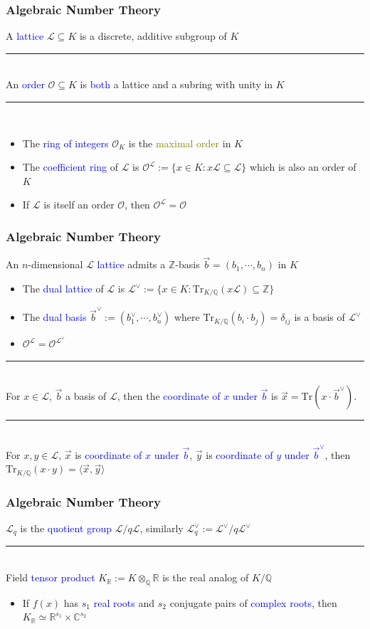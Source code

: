 \documentclass{beamer}
\newcommand{\blue}[1]{\textcolor{blue}{#1}}
\newcommand{\dgreen}[1]{\textcolor{dgreen}{#1}}
\newcommand{\olive}[1]{\textcolor{olive}{#1}}
\newcommand{\cL}{\mathcal{L}}
\newcommand{\cO}{\mathcal{O}}
\newcommand{\bbC}{\mathbb{C}}
\newcommand{\bbQ}{\mathbb{Q}}
\newcommand{\bbR}{\mathbb{R}}
\newcommand{\bbZ}{\mathbb{Z}}
\newcommand{\Tr}{\mathrm{Tr}}
\newcommand{\TrKQ}{\mathrm{Tr}_{K/\mathbb{Q}}}
\newcommand{\cOL}{\mathcal{O}^{\mathcal{L}}}
\newcommand{\cLV}{\mathcal{L}^{\vee}}
\newcommand{\KR}{K_{\mathbb{R}}}
\newcommand{\vb}{\vec{b}}
\newcommand{\vx}{\vec{x}}
\newcommand{\vy}{\vec{y}}
\newcommand{\vbV}{\vec{b}^{\vee}}
\newcommand{\divline}{\noindent\rule{6cm}{0.4pt}}
\begin{document}
\frame
{
  \frametitle{Algebraic Number Theory}
  A \blue{lattice} $\cL\subseteq K$ is a \dgreen{discrete}, \dgreen{additive subgroup} of $K$

  \noindent\rule{6cm}{0.4pt}\\
  An \blue{order} $\cO\subseteq K$ is \blue{both} a \dgreen{lattice} and a \dgreen{subring with unity} in $K$

  \noindent\rule{6cm}{0.4pt}\\
  \begin{itemize}
  	\item The \blue{ring of integers} $\cO_K$ is the \olive{maximal order} in $K$
  	\item The \blue{coefficient ring} of $\cL$ is $\cOL:=\{x\in K:x\cL\subseteq\cL\}$ which is \dgreen{also an order} of $K$
  	\item If $\cL$ is itself an order $\cO$, then $\cOL=\cO$
  \end{itemize}
}

\frame
{
  \frametitle{Algebraic Number Theory}
  An $n$-dimensional $\cL$ \blue{lattice} admits a \dgreen{$\bbZ$-basis} $\vb=(b_1,\cdots,b_n)$ in $K$
  \begin{itemize}
  	\item The \blue{dual lattice} of $\cL$ is $\cLV:=\{x\in K:\TrKQ(x\cL)\subseteq\bbZ\}$
  	\item The \blue{dual basis} $\vbV:=(b_1^{\vee},\cdots,b_n^{\vee})$ where $\TrKQ(b_i\cdot b_j)=\delta_{ij}$ \dgreen{is a basis of} $\cLV$
  	\item $\cOL=\cO^{\cLV}$
  \end{itemize}

  \divline\\

  For $x\in\cL$, $\vb$ a basis of $\cL$, then the \blue{coordinate of $x$ under $\vb$} is $\vx=\Tr(x\cdot\vbV)$.

  \divline\\

  For $x,y\in\cL$, $\vx$ is \blue{coordinate of $x$ under $\vb$}, $\vy$ is \blue{coordinate of $y$ under $\vbV$}, then $\TrKQ(x\cdot y)=\langle\vx,\vy\rangle$
}

\frame
{
  \frametitle{Algebraic Number Theory}
  $\cL_q$ is the \blue{quotient group} $\cL/q\cL$, similarly $\cLV_q:=\cLV/q\cLV$

  \divline\\

  Field \blue{tensor product} $\KR:=K\otimes_{\bbQ}\bbR$ is the \dgreen{real analog} of $K/\bbQ$
  \begin{itemize}
  	\item If $f(x)$ has $s_1$ \blue{real roots} and $s_2$ conjugate pairs of \blue{complex roots}, then $\KR\simeq\bbR^{s_1}\times\bbC^{s_2}$
  \end{itemize}
}
\end{document}
